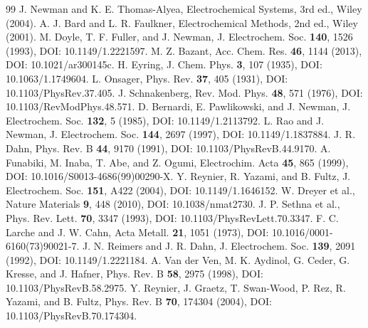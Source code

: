 \documentclass[11pt,a4paper]{article}
\theoremstyle{anodeblock}
\begin{document}
\begin{thebibliography}{99}
J. Newman and K. E. Thomas-Alyea,
Electrochemical Systems, 3rd ed., Wiley (2004).
A. J. Bard and L. R. Faulkner,
Electrochemical Methods, 2nd ed., Wiley (2001).
M. Doyle, T. F. Fuller, and J. Newman,
J. Electrochem. Soc. \textbf{140}, 1526 (1993),
DOI: 10.1149/1.2221597.
M. Z. Bazant, Acc. Chem. Res. \textbf{46}, 1144 (2013),
DOI: 10.1021/ar300145c.
H. Eyring, J. Chem. Phys. \textbf{3}, 107 (1935),
DOI: 10.1063/1.1749604.
L. Onsager, Phys. Rev. \textbf{37}, 405 (1931),
DOI: 10.1103/PhysRev.37.405.
J. Schnakenberg, Rev. Mod. Phys. \textbf{48}, 571 (1976),
DOI: 10.1103/RevModPhys.48.571.
D. Bernardi, E. Pawlikowski, and J. Newman,
J. Electrochem. Soc. \textbf{132}, 5 (1985),
DOI: 10.1149/1.2113792.
L. Rao and J. Newman, J. Electrochem. Soc. \textbf{144}, 2697 (1997),
DOI: 10.1149/1.1837884.
J. R. Dahn, Phys. Rev. B \textbf{44}, 9170 (1991),
DOI: 10.1103/PhysRevB.44.9170.
A. Funabiki, M. Inaba, T. Abe, and Z. Ogumi,
Electrochim. Acta \textbf{45}, 865 (1999),
DOI: 10.1016/S0013-4686(99)00290-X.
Y. Reynier, R. Yazami, and B. Fultz,
J. Electrochem. Soc. \textbf{151}, A422 (2004),
DOI: 10.1149/1.1646152.
W. Dreyer et al., Nature Materials \textbf{9}, 448 (2010),
DOI: 10.1038/nmat2730.
J. P. Sethna et al., Phys. Rev. Lett. \textbf{70}, 3347 (1993),
DOI: 10.1103/PhysRevLett.70.3347.
F. C. Larche and J. W. Cahn,
Acta Metall. \textbf{21}, 1051 (1973),
DOI: 10.1016/0001-6160(73)90021-7.
J. N. Reimers and J. R. Dahn,
J. Electrochem. Soc. \textbf{139}, 2091 (1992),
DOI: 10.1149/1.2221184.
A. Van der Ven, M. K. Aydinol, G. Ceder, G. Kresse, and J. Hafner,
Phys. Rev. B \textbf{58}, 2975 (1998),
DOI: 10.1103/PhysRevB.58.2975.
Y. Reynier, J. Graetz, T. Swan-Wood, P. Rez, R. Yazami, and B. Fultz,
Phys. Rev. B \textbf{70}, 174304 (2004),
DOI: 10.1103/PhysRevB.70.174304.
\end{thebibliography}
\end{document}
